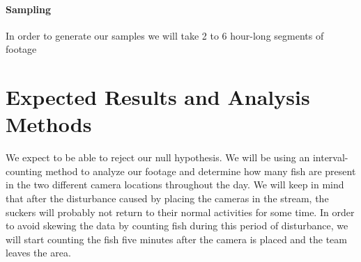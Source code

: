 \documentclass{tufte-handout}
\begin{document}
\paragraph{Sampling}
In order to generate our samples we will take 2 to 6 hour-long segments of footage 

\section{Expected Results and Analysis Methods}
We expect to be able to reject our null hypothesis. We will be using an interval-counting method to analyze our footage and determine how many fish are present in the two different camera locations throughout the day. We will keep in mind that after the disturbance caused by placing the cameras in the stream, the suckers will probably not return to their normal activities for some time. In order to avoid skewing the data by counting fish during this period of disturbance, we will start counting the fish five minutes after the camera is placed and the team leaves the area.
\end{document}
